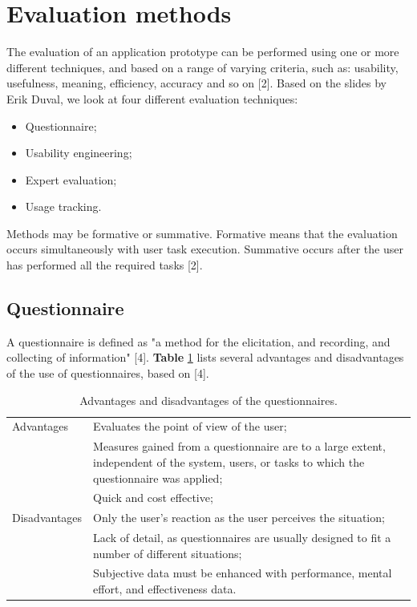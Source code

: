 \section{Evaluation methods}

The evaluation of an application prototype can be performed using one or more different techniques, and based on a range of varying criteria, such as: usability, usefulness, meaning, efficiency, accuracy and so on [2]. Based on the slides by Erik Duval, we look at four different evaluation techniques:
\begin{itemize}
	\item Questionnaire;
	\item Usability engineering;
	\item Expert evaluation;
	\item Usage tracking.
\end{itemize}

Methods may be formative or summative. Formative means that the evaluation occurs simultaneously with user task execution. Summative occurs after the user has performed all the required tasks [2].



\subsection{Questionnaire}

A questionnaire is defined as "a method for the elicitation, and recording, and collecting of information" [4]. \textbf{Table} \ref{table:questionnaires} lists several advantages and disadvantages of the use of questionnaires, based on [4].

\begin{table}[H]
	\begin{center}
		\begin{tabular}{l p{300px}}
			\hline
			Advantages		&		Evaluates the point of view of the user; \\
										&		Measures gained from a questionnaire are to a large extent, independent of the system, users, or tasks to which the questionnaire was applied; \\
										&		Quick and cost effective; \\
			\hline
			Disadvantages	&		Only the user's reaction as the user perceives the situation; \\
										&		Lack of detail, as questionnaires are usually designed to fit a number of different situations; \\
										&		Subjective data must be enhanced with performance, mental effort, and effectiveness data. \\
			\hline
		\end{tabular}
	\end{center}
	\caption{Advantages and disadvantages of the questionnaires.}
	\label{table:questionnaires}
\end{table}


